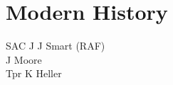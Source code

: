 \section*{Modern History}

\begin{multicols}{1}
  \small
  \noindent
  SAC J J Smart (RAF) \\
  J Moore \\
  Tpr K Heller \\
\end{multicols}





